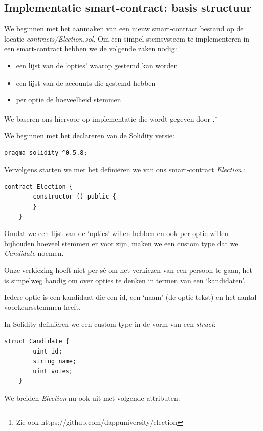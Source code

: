 	\subsection{Implementatie smart-contract: basis structuur }
	We beginnen met het aanmaken van een nieuw smart-contract bestand op de locatie \textit{contracts\slash Election.sol}. Om een simpel stemsysteem te implementeren in een smart-contract hebben we de volgende zaken nodig:
	\begin{itemize}
		\item een lijst van de `opties' waarop gestemd kan worden
		\item een lijst van de accounts die gestemd hebben
		\item per optie de hoeveelheid stemmen
	\end{itemize}
	We baseren ons hiervoor op implementatie die wordt gegeven door \textcite{McCubin2019}.\footnote{Zie ook https://github.com/dappuniversity/election}
	
	We beginnen met het declareren van de Solidity versie:
	\lstset{language=JavaScriptSolidity} 
	\begin{lstlisting}[numbers=none]
	pragma solidity ^0.5.8;
	\end{lstlisting}
	\lstset{language=JavaScriptSolidity} 

	Vervolgens starten we met het definiëren we van ons smart-contract \textit{Election} :
	\begin{lstlisting}[numbers=none]	
	contract Election {
		constructor () public {
		}
	}
	\end{lstlisting}
	
	Omdat we een lijst van de `opties' willen hebben en ook per optie willen bijhouden hoeveel stemmen er voor zijn, maken we een custom type dat we \textit{Candidate} noemen. 
	
	Onze verkiezing hoeft niet per sé om het verkiezen van een persoon te gaan, het is simpelweg handig om over opties te denken in termen van een `kandidaten'. 
	
	Iedere optie is een kandidaat die een id, een `naam' (de optie tekst) en het aantal voorkeursstemmen heeft. 
	
	In Solidity definiëren we een custom type in de vorm van een \textit{struct}:
	
	\begin{lstlisting}[numbers=none]	
	struct Candidate {
		uint id;
		string name;
		uint votes;
	}
	\end{lstlisting}
	
	We breiden \textit{Election} nu ook uit met volgende attributen:
	
